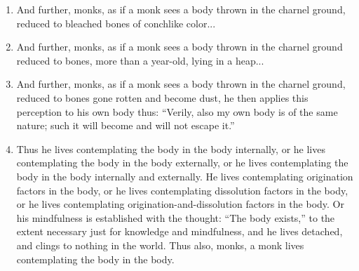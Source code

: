 \documentclass[a4 paper, 12pt]{article}
\begin{document}
\begin{enumerate}[resume]
\item And further, monks, as if a monk sees a body thrown in the charnel ground, reduced to bleached bones of conchlike color...
\item And further, monks, as if a monk sees a body thrown in the charnel ground reduced to bones, more than a year-old, lying in a heap...
\item And further, monks, as if a monk sees a body thrown in the charnel ground, reduced to bones gone rotten and become dust, he then applies this perception to his own body thus: “Verily, also my own body is of the same nature; such it will become and will not escape it.”
\item Thus he lives contemplating the body in the body internally, or he lives contemplating the body in the body externally, or he lives contemplating the body in the body internally and externally. He lives contemplating origination factors in the body, or he lives contemplating dissolution factors in the body, or he lives contemplating origination-and-dissolution factors in the body. Or his mindfulness is established with the thought: “The body exists,” to the extent necessary just for knowledge and mindfulness, and he lives detached, and clings to nothing in the world. Thus also, monks, a monk lives contemplating the body in the body.
\end{enumerate}
\end{document}
